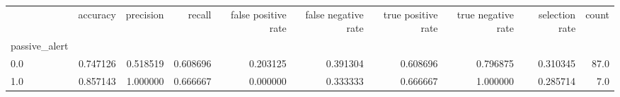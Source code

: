 \begin{tabular}{lrrrrrrrrr}
\toprule
{} &  accuracy &  precision &    recall &  false positive rate &  false negative rate &  true positive rate &  true negative rate &  selection rate &  count \\
passive\_alert &           &            &           &                      &                      &                     &                     &                 &        \\
\midrule
0.0           &  0.747126 &   0.518519 &  0.608696 &             0.203125 &             0.391304 &            0.608696 &            0.796875 &        0.310345 &   87.0 \\
1.0           &  0.857143 &   1.000000 &  0.666667 &             0.000000 &             0.333333 &            0.666667 &            1.000000 &        0.285714 &    7.0 \\
\bottomrule
\end{tabular}
